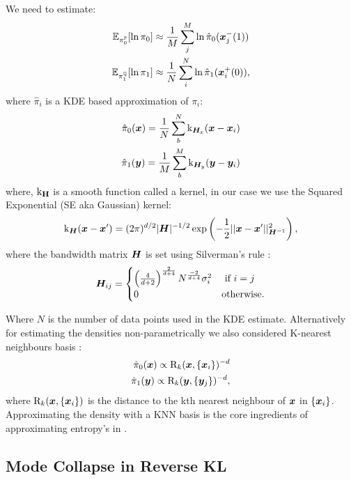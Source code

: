 \documentclass[a4paper,12pt,twoside,openright]{report}
\theoremstyle{definition}
\begin{document}
We need to estimate:
\begin{align*}
\mathbb{E}_{\pi_0^{\mathbb{P}}}[\ln\pi_{0}] &\approx \frac{1}{M}\sum_{j}^{M} \ln \hat{\pi}_0({\bm{x}}_j^{-}(1)) \\
\mathbb{E}_{\pi_1^{\mathbb{Q}}}[\ln\pi_{1}] &\approx \frac{1}{N}\sum_{i}^{N} \ln \hat{\pi}_1({\bm{x}}_i^{+}(0)),
\end{align*}
where $\hat{\pi}_i$ is a KDE based approximation of $\pi_i$:
\begin{align*}
\hat{\pi}_0({\bm{x}}) = \frac{1}{N} \sum_b^{N} {\text{k}}_{{\bm{H}}_x}({\bm{x}} - {\bm{x}}_i) \\
\hat{\pi}_1({\bm{y}}) = \frac{1}{M} \sum_b^{M} {\text{k}}_{{\bm{H}}_y}({\bm{y}} - {\bm{y}}_i)
\end{align*}
where, ${\text{k}}_{\textbf{H}}$ is a smooth function called a kernel, in our case we use the Squared Exponential (SE aka Gaussian) kernel:
\begin{align*}
{\text{k}}_{{\bm{H}}}({\bm{x}}-{\bm{x}}') = (2\pi)^{d/2}|{\bm{H}}|^{-1/2}\exp\left(-\frac{1}{2}||{\bm{x}}-{\bm{x}}'||^{2}_{{\bm{H}}^{-1}}\right),
\end{align*}
where the bandwidth matrix ${\bm{H}}$ is set using Silverman's rule \citep{silverman1986density}:
\begin{align}
{\bm{H}}_{ij} = \begin{cases}
\left(\frac{4}{d+2}\right)^{\frac{2}{d+4}} N^{\frac{-2}{d+4}} \sigma_{i}^2  &\text{  if  } i=j \\
0  &\text{otherwise}.
\end{cases}
\end{align}

Where $N$ is the number of data points used in the KDE estimate. Alternatively for estimating the densities non-parametrically we also considered K-nearest neighbours basis \citep{veksler2013nonparametric}:
\begin{align*}
\hat{\pi}_0({\bm{x}}) \propto  \text{R}_k({\bm{x}}, \{{\bm{x}}_i\})^{-d}\\
\hat{\pi}_1({\bm{y}}) \propto \text{R}_k({\bm{y}}, \{{\bm{y}}_j\})^{-d},
\end{align*}
where $\text{R}_k({\bm{x}}, \{{\bm{x}}_i\})$ is the distance to the kth nearest neighbour of ${\bm{x}}$ in $\{{\bm{x}}_i\}$.  Approximating the density with a KNN basis is the core ingredients of approximating entropy's in \cite{singh2016analysis}.

\subsection{Mode Collapse in Reverse KL}
\end{document}

